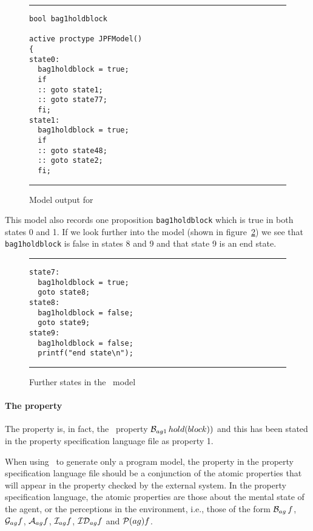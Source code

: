 \documentclass[a4]{article}
\begin{document}
\begin{figure}[htb]
\noindent\rule{\textwidth}{1pt}
\begin{small}
\begin{verbatim}
bool bag1holdblock

active proctype JPFModel()
{
state0:
  bag1holdblock = true;
  if
  :: goto state1;
  :: goto state77;
  fi;
state1:
  bag1holdblock = true;
  if
  :: goto state48;
  :: goto state2;
  fi;
\end{verbatim}
\end{small}
\rule{\textwidth}{1pt}
\caption{Model output for \spin}
\label{fig:spin_output}
\end{figure}


This model also records one proposition \texttt{bag1holdblock} which is true in both states 0 and 1. If we look further into the model (shown in figure~\ref{fig:spin_output2}) we see that \texttt{bag1holdblock} is false in states 8 and 9 and that state 9 is an end state.


\begin{figure}[htb]
\noindent\rule{\textwidth}{1pt}
\begin{small}
\begin{verbatim}
state7:
  bag1holdblock = true;
  goto state8;
state8:
  bag1holdblock = false;
  goto state9;
state9:
  bag1holdblock = false;
  printf("end state\n");
\end{verbatim}
\end{small}
\rule{\textwidth}{1pt}
\caption{Further states in the \spin\ model}
\label{fig:spin_output2}
\end{figure}

\paragraph{The property} The property is, in fact, the \ajpf\ property $\mathrm{{\cal B}}_{ag1} \, hold(block))$ and this has been stated in the property specification language file as property 1.  

When using \ajpf\ to generate only a program model, the property in the property specification language file should be a conjunction of the atomic properties that will appear in the property checked by the external system.  In the property specification language, the atomic properties are those about the mental state of the agent, or the perceptions in the environment, i.e., those of the form $\mathrm{{\cal B}}_{ag} \, f$, $\mathrm{{\cal G}}_{ag} f$, $\mathrm{{\cal A}}_{ag} f$, $\mathrm{{\cal I}}_{ag} f$, $\mathrm{{\cal ID}}_{ag} f$ and $\mathrm{{\cal P}}(ag){f}$.
\end{document}
